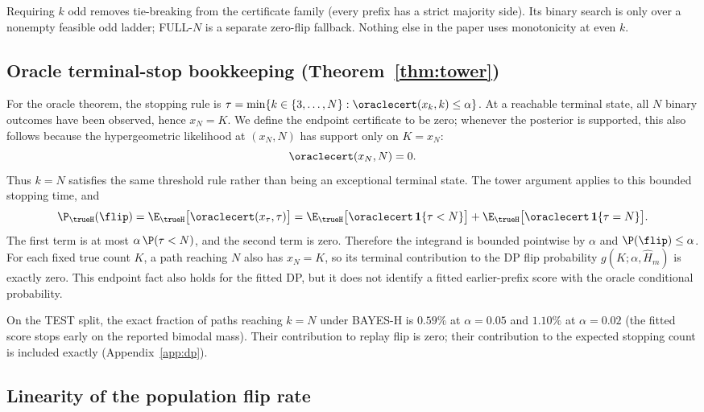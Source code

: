 \begin{remark}
Requiring $k$ odd removes tie-breaking from the certificate family
(every prefix has a strict majority side). Its binary search is only over a
nonempty feasible odd ladder; FULL-$N$ is a separate zero-flip fallback.
Nothing else in the paper uses monotonicity at even $k$.
\end{remark}

\subsection{Oracle terminal-stop bookkeeping (Theorem~\ref{thm:tower})}

For the oracle theorem, the stopping rule is
$\tau=\min\{k\in\{3,\ldots,N\}:\oraclecert(x_k,k)\le\alpha\}$.  At a reachable
terminal state, all $N$ binary outcomes have been observed, hence $x_N=K$.
We define the endpoint certificate to be zero; whenever the posterior is
supported, this also follows because the hypergeometric likelihood at
$(x_N,N)$ has support only on $K=x_N$:
\[
\oraclecert(x_N,N)=0.
\]
Thus $k=N$ satisfies the same threshold rule rather than being an exceptional
terminal state. The tower argument applies to this bounded stopping time,
and
\[
\P_{\trueH}(\flip)=\E_{\trueH}\big[\oraclecert(x_\tau,\tau)\big]
=\E_{\trueH}\big[\oraclecert\,\mathbf 1\{\tau<N\}\big]+\E_{\trueH}\big[\oraclecert\,\mathbf 1\{\tau=N\}\big].
\]
The first term is at most $\alpha\,\P(\tau<N)$, and the second term is zero.
Therefore the integrand is bounded pointwise by $\alpha$ and
$\P(\flip)\le\alpha$.  For each fixed true count $K$, a path reaching $N$
also has $x_N=K$, so its terminal contribution to the DP flip probability
$g(K;\alpha,\widehat H_m)$ is exactly zero. This endpoint fact also holds
for the fitted DP, but it does not identify a fitted earlier-prefix score with
the oracle conditional probability.

\begin{remark}
On the TEST split, the exact fraction of paths reaching $k=N$ under
BAYES-H is $0.59\%$ at $\alpha=0.05$ and $1.10\%$ at $\alpha=0.02$ (the
fitted score stops early on the reported bimodal mass). Their contribution to
replay flip is zero; their contribution to the expected stopping count is
included exactly (Appendix~\ref{app:dp}).
\end{remark}

\subsection{Linearity of the population flip rate}

